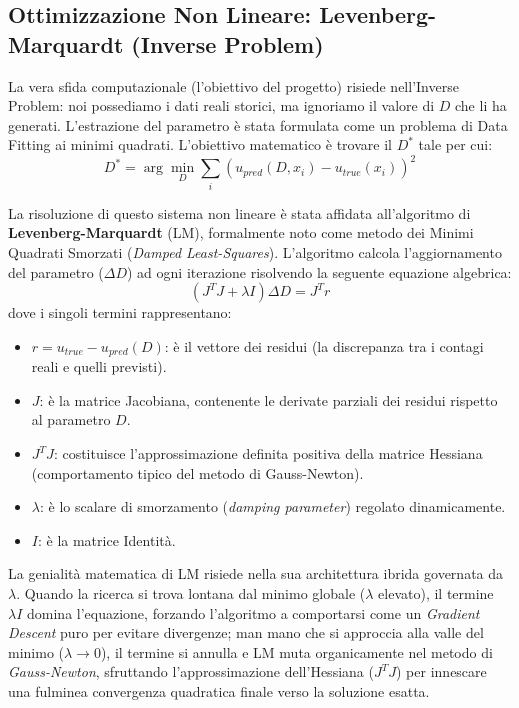 \documentclass[12pt,a4paper]{article}
\begin{document}
\subsection{Ottimizzazione Non Lineare: Levenberg-Marquardt (Inverse Problem)}
La vera sfida computazionale (l'obiettivo del progetto) risiede nell'Inverse Problem: noi possediamo i dati reali storici, ma ignoriamo il valore di $D$ che li ha generati. 
L'estrazione del parametro è stata formulata come un problema di Data Fitting ai minimi quadrati. L'obiettivo matematico è trovare il $D^*$ tale per cui:
\begin{equation}
    D^* = \arg\min_D \sum_{i} \left( u_{pred}(D, x_i) - u_{true}(x_i) \right)^2
\end{equation}

La risoluzione di questo sistema non lineare è stata affidata all'algoritmo di \textbf{Levenberg-Marquardt} (LM), formalmente noto come metodo dei Minimi Quadrati Smorzati (\textit{Damped Least-Squares}). L'algoritmo calcola l'aggiornamento del parametro ($\Delta D$) ad ogni iterazione risolvendo la seguente equazione algebrica:
\begin{equation}
    (J^T J + \lambda I) \Delta D = J^T r
\end{equation}
dove i singoli termini rappresentano:
\begin{itemize}
    \item $r = u_{true} - u_{pred}(D)$: è il vettore dei residui (la discrepanza tra i contagi reali e quelli previsti).
    \item $J$: è la matrice Jacobiana, contenente le derivate parziali dei residui rispetto al parametro $D$.
    \item $J^T J$: costituisce l'approssimazione definita positiva della matrice Hessiana (comportamento tipico del metodo di Gauss-Newton).
    \item $\lambda$: è lo scalare di smorzamento (\textit{damping parameter}) regolato dinamicamente.
    \item $I$: è la matrice Identità.
\end{itemize}
La genialità matematica di LM risiede nella sua architettura ibrida governata da $\lambda$. Quando la ricerca si trova lontana dal minimo globale ($\lambda$ elevato), il termine $\lambda I$ domina l'equazione, forzando l'algoritmo a comportarsi come un \textit{Gradient Descent} puro per evitare divergenze; man mano che si approccia alla valle del minimo ($\lambda \to 0$), il termine si annulla e LM muta organicamente nel metodo di \textit{Gauss-Newton}, sfruttando l'approssimazione dell'Hessiana ($J^T J$) per innescare una fulminea convergenza quadratica finale verso la soluzione esatta.
\end{document}
